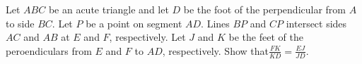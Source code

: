 Let $ABC$ be an acute triangle and let $D$ be the foot of the perpendicular from $A$ to side $BC$. Let $P$ be a point on segment $AD$. Lines $BP$ and $CP$ intersect sides $AC$ and $AB$ at $E$ and $F$,  respectively. Let $J$ and $K$ be the feet of the peroendiculars from $E$ and $F$ to $AD$,  respectively. Show that$\frac{FK}{KD}=\frac{EJ}{JD}$.